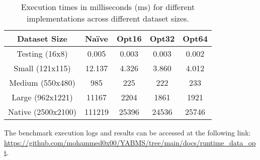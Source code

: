 \documentclass[12pt]{article}
\begin{document}
\begin{table}[h]
    \centering
    \begin{tabular}{|c|c|c|c|c|}
        \hline
        \textbf{Dataset Size} & \textbf{Naïve} & \textbf{Opt16} & \textbf{Opt32} & \textbf{Opt64}\\
        \hline
        Testing (16x8) & 0.005 & 0.003 & 0.003 & 0.002 \\
        Small (121x115) & 12.137 & 4.326 & 3.860 & 4.012 \\
        Medium (550x480) & 985 & 225 & 222 & 233 \\
        Large (962x1221) & 11167 & 2204 & 1861 & 1921 \\
        Native (2500x2100) & 111219 & 25396 & 24536 & 25746 \\
        \hline
    \end{tabular}
    \caption{Execution times in milliseconds (ms) for different implementations across different dataset sizes.}
    \label{tab:results}
\end{table}

    The benchmark execution logs and results can be accessed at the following link: \url{https://github.com/mohammed0x00/YABMS/tree/main/docs/runtime_data_opt}.
\end{document}
